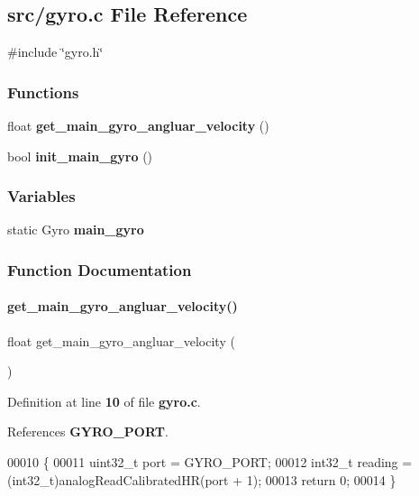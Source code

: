 \subsection{src/gyro.c File Reference}
\label{a00098}
{\ttfamily \#include \char`\"{}gyro.\+h\char`\"{}}\newline
\subsubsection*{Functions}
\begin{DoxyCompactItemize}
\item 
float \textbf{ get\+\_\+main\+\_\+gyro\+\_\+angluar\+\_\+velocity} ()
\item 
bool \textbf{ init\+\_\+main\+\_\+gyro} ()
\end{DoxyCompactItemize}
\subsubsection*{Variables}
\begin{DoxyCompactItemize}
\item 
static Gyro \textbf{ main\+\_\+gyro}
\end{DoxyCompactItemize}


\subsubsection{Function Documentation}
\mbox{\label{a00098_aec0963ebe3eb6cdfd7edaf486bbb0a87}} 
\paragraph{get\+\_\+main\+\_\+gyro\+\_\+angluar\+\_\+velocity()}
{\footnotesize\ttfamily float get\+\_\+main\+\_\+gyro\+\_\+angluar\+\_\+velocity (\begin{DoxyParamCaption}{ }\end{DoxyParamCaption})}



Definition at line \textbf{ 10} of file \textbf{ gyro.\+c}.



References \textbf{ G\+Y\+R\+O\+\_\+\+P\+O\+RT}.


\begin{DoxyCode}
00010                                        \{
00011   uint32\_t port = GYRO_PORT;
00012   int32\_t reading = (int32\_t)analogReadCalibratedHR(port + 1);
00013   \textcolor{keywordflow}{return} 0;
00014 \}
\end{DoxyCode}
\mbox{\label{a00098_a47c0a78a867be91a28e278bf433d699c}} 
